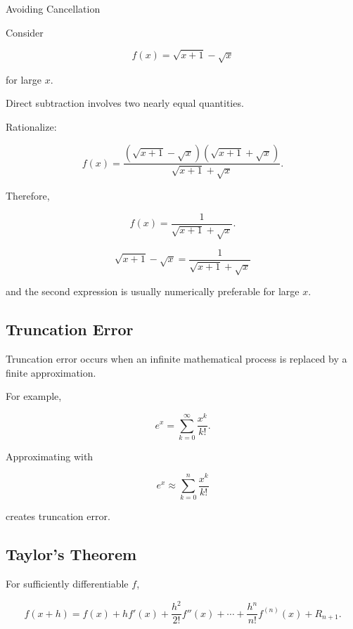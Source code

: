 \begin{workedexamplebox}{Avoiding Cancellation}

Consider

\[
f(x)
=
\sqrt{x+1}-\sqrt{x}
\]

for large \(x\).

Direct subtraction involves two nearly equal quantities.

Rationalize:

\[
f(x)
=
\frac{
(\sqrt{x+1}-\sqrt{x})
(\sqrt{x+1}+\sqrt{x})
}{
\sqrt{x+1}+\sqrt{x}
}.
\]

Therefore,

\[
f(x)
=
\frac{
1
}{
\sqrt{x+1}+\sqrt{x}
}.
\]

\begin{answerbox}
\[
\boxed{
\sqrt{x+1}-\sqrt{x}
=
\frac{
1
}{
\sqrt{x+1}+\sqrt{x}
}
}
\]

and the second expression is usually numerically preferable for large
\(x\).
\end{answerbox}

\end{workedexamplebox}

\subsection{Truncation Error}
\label{subsec:truncation-error}

Truncation error occurs when an infinite mathematical process is replaced
by a finite approximation.

For example,

\[
e^x
=
\sum_{k=0}^{\infty}
\frac{x^k}{k!}.
\]

Approximating with

\[
\boxed{
e^x
\approx
\sum_{k=0}^{n}
\frac{x^k}{k!}
}
\]

creates truncation error.

\subsection{Taylor's Theorem}
\label{subsec:taylor-theorem-numerical}

For sufficiently differentiable \(f\),

\[
f(x+h)
=
f(x)
+
hf'(x)
+
\frac{h^2}{2!}f''(x)
+
\cdots
+
\frac{h^n}{n!}f^{(n)}(x)
+
R_{n+1}.
\]

